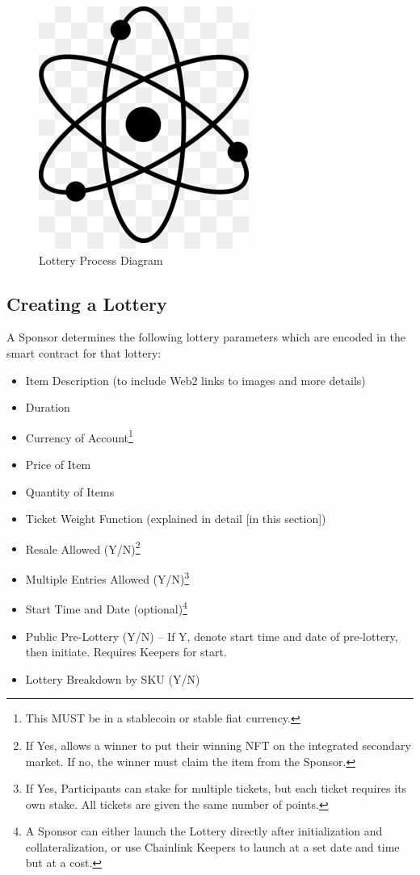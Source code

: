 \documentclass[runningheads]{llncs}
\begin{document}
\begin{figure}[H]
\centering
\includegraphics[scale=0.5]{Figures_and_Tables/atom.png}
\caption{Lottery Process Diagram}
\end{figure}

\subsection{Creating a Lottery}
A Sponsor determines the following lottery parameters which are encoded in the smart contract for that lottery:

\begin{itemize}
\item Item Description (to include Web2 links to images and more details)
\item Duration
\item Currency of Account\footnote{This MUST be in a stablecoin or stable fiat currency.}
\item Price of Item
\item Quantity of Items
\item Ticket Weight Function (explained in detail [in this section])
\item Resale Allowed (Y/N)\footnote{If Yes, allows a winner to put their winning NFT on the integrated secondary market.  If no, the winner must claim the item from the Sponsor.}
\item Multiple Entries Allowed (Y/N)\footnote{If Yes, Participants can stake for multiple tickets, but each ticket requires its own stake.  All tickets are given the same number of points.}
\item Start Time and Date (optional)\footnote{A Sponsor can either launch the Lottery directly after initialization and collateralization, or use Chainlink Keepers to launch at a set date and time but at a cost.}
\item Public Pre-Lottery (Y/N) – If Y, denote start time and date of pre-lottery, then initiate.  Requires Keepers for start.
\item Lottery Breakdown by SKU (Y/N)
\end{itemize}
\end{document}
